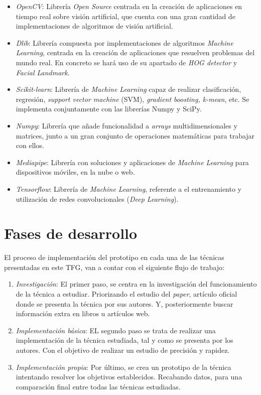 \begin{itemize}
	\item \textit{OpenCV}: Librería \textit{Open Source} centrada en la creación de aplicaciones en tiempo real sobre visión artificial, que cuenta con una gran cantidad de implementaciones de algoritmos de visión artificial.
	\item \textit{Dlib}: Librería compuesta por implementaciones de algoritmos \textit{Machine Learning}, centrada en la creación de aplicaciones que resuelven problemas del mundo real. En concreto se hará uso de su apartado de \textit{HOG detector} y \textit{Facial Landmark}.
	\item \textit{Scikit-learn}: Librería de \textit{Machine Learning} capaz de realizar clasificación, regresión, \textit{support vector machine} (SVM), \textit{gradient boosting, \textit{k-mean}}, etc. Se implementa conjuntamente con las librerías Numpy y SciPy.
	\item \textit{Numpy}: Librería que añade funcionalidad a \textit{arrays} multidimensionales y matrices, junto a un gran conjunto de operaciones matemáticas para trabajar con ellos.
	\item \textit{Mediapipe}: Librería con soluciones y aplicaciones de \textit{Machine Learning} para dispositivos móviles, en la nube o web.
	\item \textit{Tensorflow}: Librería de \textit{Machine Learning}, referente a el entrenamiento y utilización de redes convolucionales (\textit{Deep Learning}).
\end{itemize}

\vspace{-1cm}
\section*{Fases de desarrollo}
\vspace{-0.5cm}
El proceso de implementación del prototipo en cada una de las técnicas presentadas en este TFG, van a contar con el siguiente flujo de trabajo:

\begin{enumerate}
	\item \textit{Investigación}: El primer paso, se centra en la investigación del funcionamiento de la técnica a estudiar. Priorizando el estudio del \textit{paper}, artículo oficial donde se presenta la técnica por sus autores. Y, posteriormente buscar información extra en libros u artículos web.
	\item \textit{Implementación básica}: EL segundo paso se trata de realizar una implementación de la técnica estudiada, tal y como se presenta por los autores. Con el objetivo de realizar un estudio de precisión y rapidez.
	\item \textit{Implementación propia}: Por último, se crea un prototipo de la técnica intentando resolver los objetivos establecidos. Recabando datos, para una comparación final entre todas las técnicas estudiadas.
\end{enumerate}

